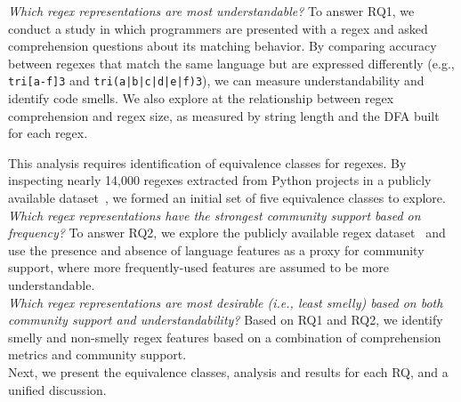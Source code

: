 {\em Which regex representations are most understandable?}
To answer RQ1, we conduct a study in which programmers are presented with a regex and asked comprehension questions about its matching behavior.  By comparing accuracy between regexes that match the same language but are expressed differently (e.g., \verb!tri[a-f]3! and \verb!tri(a|b|c|d|e|f)3!), we can measure understandability and identify code smells. We also explore at the relationship between regex comprehension and regex size, as measured by string length and the DFA built for each regex.

This analysis requires identification of equivalence classes for regexes. By inspecting  nearly 14,000 regexes extracted from Python projects in a publicly available dataset~\cite{chapman2016}, we formed an initial set of five equivalence classes to explore. \\

 {\em Which regex representations have the strongest {community support} based on  frequency?} %
To answer RQ2, we explore the publicly available regex dataset~\cite{chapman2016} and use the presence and absence of language features as a proxy for community support, where more frequently-used features are assumed to be more understandable.\\

  {\em Which regex representations are most desirable (i.e., least smelly) based on both community support and understandability?}
Based on RQ1 and RQ2, we identify smelly and non-smelly regex features  based on a combination of comprehension metrics and community support. \\

Next, we present the equivalence classes, analysis and results for each RQ, and a unified discussion.



%
%
%
%
%
%
%




